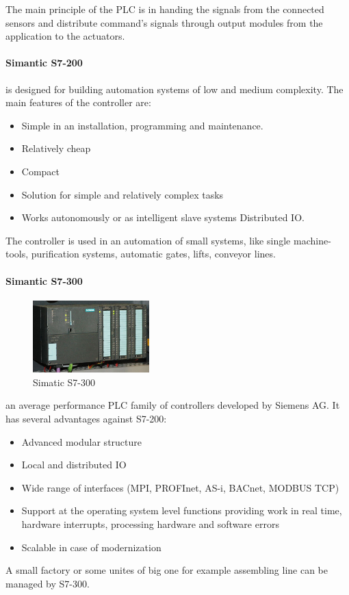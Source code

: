 \documentclass[english]{article}
\begin{document}
The main principle of the PLC is in handing the signals from the connected sensors and distribute command's signals through output modules from the application to the actuators.  
\paragraph{Simantic S7-200}
is designed for building automation systems of low and medium complexity. The main features of the controller are:
\begin{itemize}
\item Simple in an installation, programming and maintenance.
\item Relatively cheap
\item Compact
\item Solution for simple and relatively complex tasks
\item Works autonomously or as intelligent slave systems Distributed IO.
\end{itemize}
The controller is used in an automation of small systems, like single machine-tools, purification systems, automatic gates, lifts, conveyor lines.
\paragraph{Simantic S7-300}
\begin{figure}
  \begin{center}
    \includegraphics[width=0.4\textwidth]{SiemensSimantic/640px-S7300}
  \end{center}
  \caption{Simatic S7-300}
\end{figure}
an average performance PLC family of controllers developed by Siemens AG. It has several advantages  against S7-200:

\begin{itemize}
\item Advanced modular structure
\item Local and distributed IO
\item Wide range of interfaces (MPI, PROFInet, AS-i, BACnet, MODBUS TCP)
\item Support at the operating system level functions providing work in real time, hardware interrupts,  processing hardware and software errors
\item Scalable in case of modernization
\end{itemize}
A small factory or some unites of big one for example assembling line can be managed by S7-300.
\end{document}
